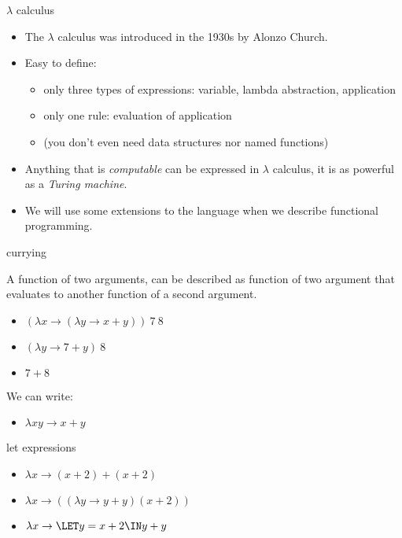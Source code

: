 \begin{frame}{$\lambda$ calculus}
  \begin{itemize}

    \pause \item The $\lambda$ calculus was introduced in the 1930s by Alonzo Church. 

    \pause \item Easy to define:
      \begin{itemize} 
         \pause \item only three types of expressions: variable, lambda abstraction, application 
         \pause \item only one rule: evaluation of application
         \pause \item (you don't even need data structures nor named functions)
      \end{itemize}

    \pause \item Anything that is {\em computable} can be expressed in
    $\lambda$ calculus, it is as powerful as a {\em Turing machine}.

    \pause \item We will use some extensions to the language when we describe
    functional programming.
  \end{itemize}
\end{frame}


\begin{frame}{currying}

  A function of two arguments, can be described as function of two
  argument that evaluates to another function of a second argument.

  \begin{itemize}
   \pause \item $(\lambda x \rightarrow (\lambda y \rightarrow x + y)) \ 7 \ 8$
   \pause \item $(\lambda y \rightarrow 7 + y) \ 8$
   \pause \item $7 + 8$
  \end{itemize}

 \vspace{10pt}
 We can write:
  \begin{itemize}
   \pause \item $\lambda x y \rightarrow  x + y$
  \end{itemize}

\end{frame}

\begin{frame}{let expressions}
  \begin{itemize}  
   \pause \item $\lambda x \rightarrow  (x + 2) +  (x + 2)$
   \pause \item $\lambda x \rightarrow  ((\lambda y \rightarrow y + y) (x + 2))$  
   \pause \item $\lambda x \rightarrow  \LET y = x + 2 \IN y + y $
  \end{itemize}
\end{frame}

